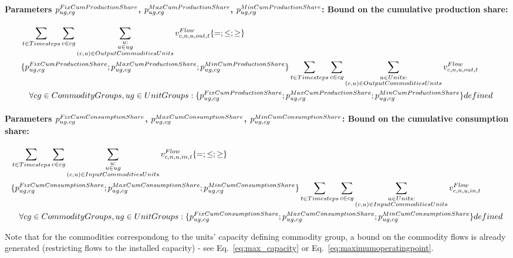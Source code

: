 \paragraph{Parameters $\pFixCumProductionShare$, $\pMaxCumProductionShare$, $\pMinCumProductionShare$: Bound on the cumulative production share:}
\begin{align} \label{eq:cumproductionshare}
&\sum_{\timesteps} \sum_{\commodity \in \commoditygroup} \sum_{\substack{\unit: \\ \unit \in \unitgroup \\ \OutputCommoditiesUnits}} \vFlow[\commodity,\node,\unit,out,\timestep]  \{=;\le;\ge\}  \nonumber \\
&\{ \pFixCumProductionShare ; \pMaxCumProductionShare ; \pMinCumProductionShare \} \sum_{\timesteps} \sum_{\commodity \in \commoditygroup} \sum_{\substack{\units: \\ \OutputCommoditiesUnits}} \vFlow[\commodity,\node, \unit,out,\timestep] \nonumber \\
&\quad \forall \commoditygroups, \unitgroups: \{ \pFixCumProductionShare ; \pMaxCumProductionShare ; \pMinCumProductionShare \} defined
\end{align}

\paragraph{Parameters $\pFixCumConsumptionShare$, $\pMaxCumConsumptionShare$, $\pMinCumConsumptionShare$: Bound on the cumulative consumption share:}
\begin{align} \label{eq:cumconsumptionshare}
&\sum_{\timesteps} \sum_{\commodity \in \commoditygroup} \sum_{\substack{\unit: \\ \unit \in \unitgroup \\ \InputCommoditiesUnits}} \vFlow[\commodity,\node,\unit,in,\timestep] \{=;\le;\ge\} \nonumber \\
&\{ \pFixCumConsumptionShare ; \pMaxCumConsumptionShare ; \pMinCumConsumptionShare \} \sum_{\timesteps} \sum_{\commodity \in \commoditygroup} \sum_{\substack{\units: \\ \InputCommoditiesUnits}} \vFlow[\commodity,\node, \unit,in,\timestep] \nonumber \\
&\quad \forall \commoditygroups, \unitgroups: \{ \pFixCumConsumptionShare ; \pMaxCumConsumptionShare ; \pMinCumConsumptionShare \} defined
\end{align}


Note that for the commodities correspondong to the units' capacity defining commodity group, a bound on the commodity flows is already generated (restricting flows to the installed capacity) - see Eq.~\eqref{eq:max_capacity} or Eq.~\eqref{eq:maximumoperatingpoint}.

